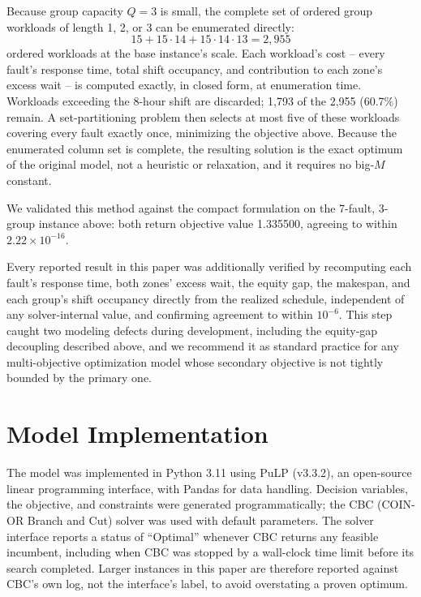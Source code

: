 \documentclass[11pt]{article}
\begin{document}
Because group capacity $Q=3$ is small, the complete set of ordered group workloads of length 1, 2, or 3 can be enumerated directly:
\[
15 + 15\cdot14 + 15\cdot14\cdot13 = 2{,}955
\]
ordered workloads at the base instance's scale. Each workload's cost -- every fault's response time, total shift occupancy, and contribution to each zone's excess wait -- is computed exactly, in closed form, at enumeration time. Workloads exceeding the 8-hour shift are discarded; 1{,}793 of the 2{,}955 (60.7\%) remain. A set-partitioning problem then selects at most five of these workloads covering every fault exactly once, minimizing the objective above. Because the enumerated column set is complete, the resulting solution is the exact optimum of the original model, not a heuristic or relaxation, and it requires no big-$M$ constant.

We validated this method against the compact formulation on the 7-fault, 3-group instance above: both return objective value 1.335500, agreeing to within $2.22\times10^{-16}$.

Every reported result in this paper was additionally verified by recomputing each fault's response time, both zones' excess wait, the equity gap, the makespan, and each group's shift occupancy directly from the realized schedule, independent of any solver-internal value, and confirming agreement to within $10^{-6}$. This step caught two modeling defects during development, including the equity-gap decoupling described above, and we recommend it as standard practice for any multi-objective optimization model whose secondary objective is not tightly bounded by the primary one.

\section*{Model Implementation}

The model was implemented in Python 3.11 using PuLP (v3.3.2), an open-source linear programming interface, with Pandas for data handling. Decision variables, the objective, and constraints were generated programmatically; the CBC (COIN-OR Branch and Cut) solver was used with default parameters. The solver interface reports a status of ``Optimal'' whenever CBC returns any feasible incumbent, including when CBC was stopped by a wall-clock time limit before its search completed. Larger instances in this paper are therefore reported against CBC's own log, not the interface's label, to avoid overstating a proven optimum.
\end{document}
